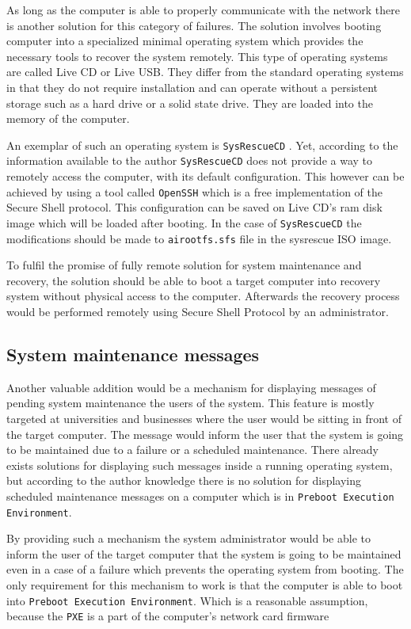 \documentclass[../main.tex]{subfiles}
\begin{document}
As long as the computer is able to properly communicate with the network there is another solution for this category
of failures. The solution involves booting computer into a specialized minimal operating system which provides
the necessary tools to recover the system remotely. This type of operating systems are called Live CD \cite{livecdlist} or Live USB.
They differ from the standard operating systems in that they do not require installation and can operate without
a persistent storage such as a hard drive or a solid state drive. They are loaded into the memory of the computer.

An exemplar of such an operating system is \texttt{SysRescueCD} \cite{sysrescuecd}.
Yet, according to the information available to the author \texttt{SysRescueCD} does not provide a way to remotely access the computer,
with its default configuration. This however can be achieved by using a tool called \texttt{OpenSSH} \cite{openssh} which is a free implementation of the Secure Shell protocol.
This configuration can be saved on Live CD's ram disk image which will be loaded after booting. In the case of
\texttt{SysRescueCD} the modifications should be made to \texttt{airootfs.sfs} file in the sysrescue ISO image.

To fulfil the promise of fully remote solution for system maintenance and recovery, the solution should be able to
boot a target computer into recovery system without physical access to the computer. Afterwards the recovery process
would be performed remotely using Secure Shell Protocol by an administrator.

\subsection{System maintenance messages}
Another valuable addition would be a mechanism for displaying messages of pending system maintenance the users of the system.
This feature is mostly targeted at universities and businesses where the user would be sitting in front of the target computer.
The message would inform the user that the system is going to be maintained due to a failure or a scheduled maintenance.
There already exists solutions for displaying such messages inside a running operating system, but according
to the author knowledge there is no solution for displaying scheduled maintenance messages on a computer which is in \texttt{Preboot Execution Environment}\cite{pxespec}.

By providing such a mechanism the system administrator would be able to inform the user of the target computer that
the system is going to be maintained even in a case of a failure which prevents the operating system from booting.
The only requirement for this mechanism to work is that the computer is able to boot into \texttt{Preboot Execution Environment}.
Which is a reasonable assumption, because the \texttt{PXE} is a part of the computer's network card firmware
\end{document}
